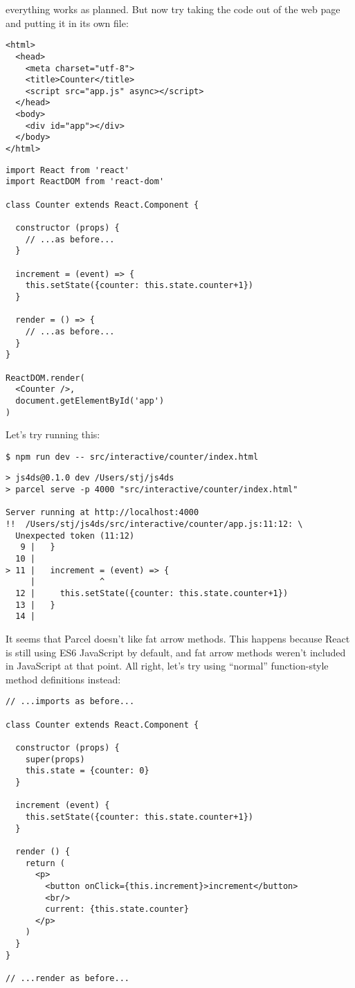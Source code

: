 \noindent
everything works as planned.
But now try taking the code out of the web page and putting it in its own file:

\begin{verbatim}
<html>
  <head>
    <meta charset="utf-8">
    <title>Counter</title>
    <script src="app.js" async></script>
  </head>
  <body>
    <div id="app"></div>
  </body>
</html>
\end{verbatim}

\begin{verbatim}
import React from 'react'
import ReactDOM from 'react-dom'

class Counter extends React.Component {

  constructor (props) {
    // ...as before...
  }

  increment = (event) => {
    this.setState({counter: this.state.counter+1})
  }

  render = () => {
    // ...as before...
  }
}

ReactDOM.render(
  <Counter />,
  document.getElementById('app')
)
\end{verbatim}

Let's try running this:

\begin{verbatim}
$ npm run dev -- src/interactive/counter/index.html
\end{verbatim}

\begin{verbatim}
> js4ds@0.1.0 dev /Users/stj/js4ds
> parcel serve -p 4000 "src/interactive/counter/index.html"

Server running at http://localhost:4000
!!  /Users/stj/js4ds/src/interactive/counter/app.js:11:12: \
  Unexpected token (11:12)
   9 |   }
  10 |
> 11 |   increment = (event) => {
     |             ^
  12 |     this.setState({counter: this.state.counter+1})
  13 |   }
  14 |
\end{verbatim}

It seems that Parcel doesn't like fat arrow methods.
This happens because React is still using ES6 JavaScript by default,
and fat arrow methods weren't included in JavaScript at that point.
All right, let's try using ``normal'' function-style method definitions instead:

\begin{verbatim}
// ...imports as before...

class Counter extends React.Component {

  constructor (props) {
    super(props)
    this.state = {counter: 0}
  }

  increment (event) {
    this.setState({counter: this.state.counter+1})
  }

  render () {
    return (
      <p>
        <button onClick={this.increment}>increment</button>
        <br/>
        current: {this.state.counter}
      </p>
    )
  }
}

// ...render as before...
\end{verbatim}

